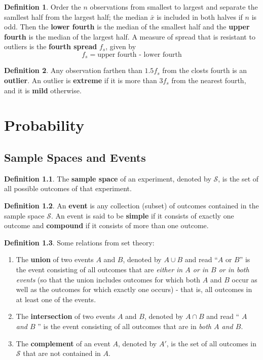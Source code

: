 \documentclass[a4paper]{report}
\theoremstyle{definition}
\newtheorem{definition}{Definition}
\theoremstyle{plain}
\begin{document}
\begin{definition}
  Order the $n$ observations from smallest to largest and separate the samllest
  half from the largest half; the median $\bar{x}$ is included in both halves
  if $n$ is odd. Then the \textbf{lower fourth} is the median of the smallest
  half and the \textbf{upper fourth} is the median of the largest half. A
  measure of spread that is resistant to outliers is the \textbf{fourth spread}
  $f_s$, given by
  \begin{equation*}
    f_s = \text{upper fourth - lower fourth}
  \end{equation*}
\end{definition}

\begin{definition}
  Any observation farthen than $1.5f_s$ from the closts fourth is an \textbf{outlier}. An outlier is \textbf{extreme} if it is more than $3f_s$ from the nearest
  fourth, and it is \textbf{mild} otherwise.
\end{definition}
\chapter{Probability}

\section{Sample Spaces and Events}
\begin{definition} 
  The \textbf{sample space} of an experiment, denoted by $\mathcal{S}$,
  is the set of all possible outcomes of that experiment.
\end{definition}

\begin{definition}
An \textbf{event} is any collection (subset) of outcomes contained in
the sample space $\mathcal{S}$. An event is said to be \textbf{simple}
if it consists of exactly one outcome and \textbf{compound} if it
consists of more than one outcome.
\end{definition}

\begin{definition}
  Some relations from set theory:
  \begin{enumerate}
    \item The \textbf{union} of two events $A$ and $B$, denoted by $A\cup B$ and
      read ``$A$ or $B$'' is the event consisting of all outcomes that are
      \textit{either in $A$ or in $B$ or in both events} (so that the union
      includes outcomes for which both $A$ and $B$ occur as well as the outcomes
      for which exactly one occurs) - that is, all outcomes in at least one of
      the events.
    \item The \textbf{intersection} of two events $A$ and $B$, denoted by $A \cap
      B$ and read `` \textit{$A$ and $B$} '' is the event consisting of all
      outcomes that are in \textit{both $A$ and $B$}.
    \item The \textbf{complement} of an event $A$, denoted by $A'$, is the set of
      all outcomes in $\mathcal{S}$ that are not contained in $A$.
  \end{enumerate}
\end{definition}
\end{document}
